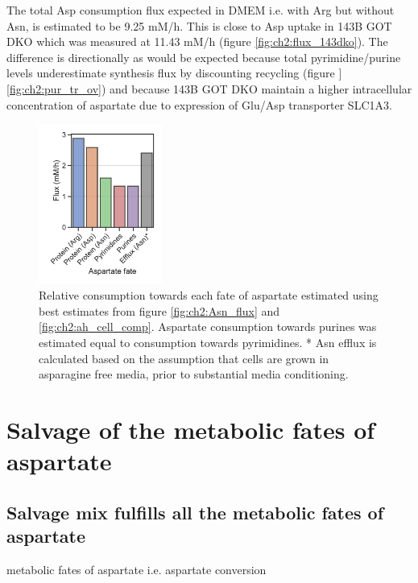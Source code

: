 The total Asp consumption flux expected in DMEM i.e. with Arg but without Asn, is estimated to be 9.25 mM/h.
This is close to Asp uptake in 143B GOT DKO which was measured at 11.43 mM/h (figure \ref{fig:ch2:flux_143dko}).
The difference is directionally as would be expected because total pyrimidine/purine levels underestimate synthesis flux by discounting recycling (figure ]\ref{fig:ch2:pur_tr_ov}) and because 143B GOT DKO maintain a higher intracellular concentration of aspartate due to expression of Glu/Asp transporter SLC1A3.
\begin{figure}
    \centering
    \includegraphics[width=0.36\textwidth]{figures/chap2/asp_fate.pdf}
    \caption[Relative consumption towards each fate of aspartate]{
    Relative consumption towards each fate of aspartate estimated using best estimates from figure \ref{fig:ch2:Asn_flux} and \ref{fig:ch2:ah_cell_comp}.
    Aspartate consumption towards purines was estimated equal to consumption towards pyrimidines.
    * Asn efflux is calculated based on the assumption that cells are grown in asparagine free media, prior to substantial media conditioning.
    }
    \label{fig:ch2:asp_fate}
\end{figure}






\section{Salvage of the metabolic fates of aspartate}

\subsection{Salvage mix fulfills all the metabolic fates of aspartate}

metabolic fates of aspartate i.e. aspartate conversion 


